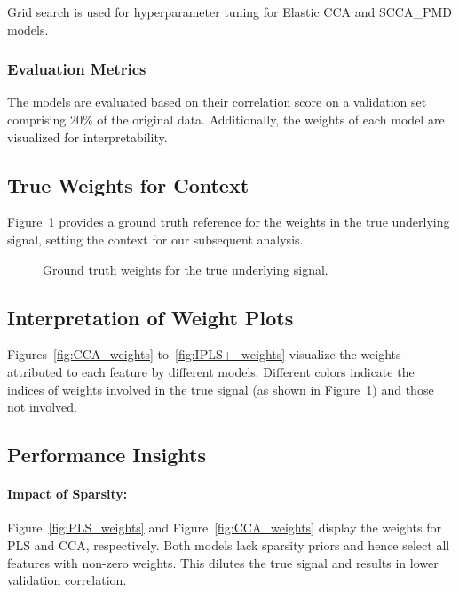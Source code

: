 Grid search is used for hyperparameter tuning for Elastic CCA and SCCA\_PMD models.

\subsubsection{Evaluation Metrics}

The models are evaluated based on their correlation score on a validation set comprising 20\% of the original data. Additionally, the weights of each model are visualized for interpretability.

\subsection{True Weights for Context}

Figure~\ref{fig:True_weights} provides a ground truth reference for the weights in the true underlying signal, setting the context for our subsequent analysis.

\begin{figure}[h]
    \centering
    
    \caption{Ground truth weights for the true underlying signal.}
    \label{fig:True_weights}
\end{figure}

\subsection{Interpretation of Weight Plots}

Figures~\ref{fig:CCA_weights} to~\ref{fig:IPLS+_weights} visualize the weights attributed to each feature by different models.
Different colors indicate the indices of weights involved in the true signal (as shown in Figure~\ref{fig:True_weights}) and those not involved.

\subsection{Performance Insights}

\paragraph{Impact of Sparsity:}
Figure~\ref{fig:PLS_weights} and Figure~\ref{fig:CCA_weights} display the weights for PLS and CCA, respectively.
Both models lack sparsity priors and hence select all features with non-zero weights.
This dilutes the true signal and results in lower validation correlation.

